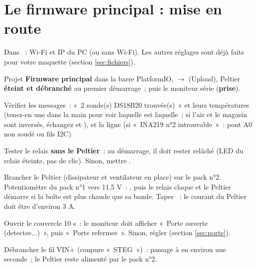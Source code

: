 \section{Le firmware principal : mise en route}\label{sec:miseenroute}

\begin{steps}
  \item Dans ~: Wi-Fi et IP du PC (ou  sans Wi-Fi). Les autres réglages sont déjà faits pour votre maquette (section \ref{sec:fichiers}).
  \item Projet \textbf{Firmware principal} dans la barre PlatformIO, \textbf{$\rightarrow$} (Upload), Peltier \textbf{éteint et débranché} au premier démarrage~; puis le moniteur série (\textbf{prise}).
  \item Vérifier les messages~: «~2 sonde(s) DS18B20 trouvée(s)~» et leurs températures (tenez-en une dans la main pour voir laquelle est laquelle~; si l'air et le magasin sont inversés, échangez  et ), et la ligne  (si «~INA219 n°2 introuvable~»~: pont A0 non soudé ou fils I2C).
  \item Tester le relais \textbf{sans le Peltier}~: au démarrage, il doit rester relâché (LED du relais éteinte, pas de clic). Sinon, mettre .
  \item Brancher le Peltier (dissipateur et ventilateur en place) sur le pack n°2. Potentiomètre du pack n°1 vers 11,5 V~: , puis le relais claque et le Peltier démarre si la boîte est plus chaude que sa bande. Taper ~: le courant du Peltier doit être d'environ 3 A.
  \item Ouvrir le couvercle 10 s~: le moniteur doit afficher «~Porte ouverte (detectee...)~», puis «~Porte refermee~». Sinon, régler  (section \ref{sec:porte}).
  \item Débrancher le fil VIN+ (coupure «~STEG~»)~: passage à  en environ une seconde~; le Peltier reste alimenté par le pack n°2.
\end{steps}


